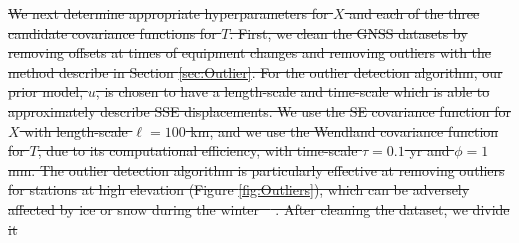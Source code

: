 \documentclass[extra,mreferee]{gji}
\providecommand{\DIFdel}[1]{{\protect\color{red}\sout{#1}}}                      %
\providecommand{\DIFaddbegin}{} %
\providecommand{\DIFdelbegin}{} %
\providecommand{\DIFdelend}{} %
\begin{document}
\DIFdelbegin \DIFdel{We next determine appropriate hyperparameters for $X$ and each of the three candidate covariance functions for $T$. First, we clean the
GNSS datasets by removing offsets at times of equipment changes and removing outliers with the method describe in Section \ref{sec:Outlier}. For the outlier detection algorithm, our prior model, $u$, is chosen to have a length-scale and time-scale which is able to approximately describe SSE displacements. We
use the SE covariance function for $X$ with length-scale $\ell = 100$ km, and we use the Wendland covariance function for $T$, due to its computational efficiency, with time-scale $\tau = 0.1$ yr and $\phi = 1$ mm. The outlier detection algorithm is particularly effective at removing outliers for stations at high elevation (Figure \ref{fig:Outliers}), which can be adversely affected by ice or snow during the
winter \mbox{%
\citep{Lisowski2008}}%
. After cleaning the dataset, we divide
it }\DIFdelend %
\DIFaddbegin 
\end{document}
